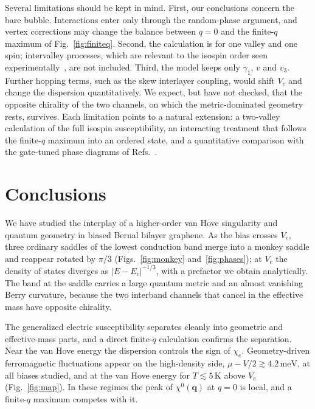 \documentclass[12pt,a4paper]{article}
\newcommand{\bq}{\mathbf{q}}
\newcommand{\chie}{\chi_{e}}
\newcommand{\meV}{\,\mathrm{meV}}
\begin{document}
Several limitations should be kept in mind. First, our conclusions concern the bare bubble. Interactions enter only through the random-phase argument, and vertex corrections may change the balance between $q=0$ and the finite-$q$ maximum of Fig.~\ref{fig:finiteq}. Second, the calculation is for one valley and one spin; intervalley processes, which are relevant to the isospin order seen experimentally~\citep{Zhou2022,Seiler2022,delaBarrera2022}, are not included. Third, the model keeps only $\gamma_1$, $v$ and $v_3$. Further hopping terms, such as the skew interlayer coupling, would shift $V_c$ and change the dispersion quantitatively. We expect, but have not checked, that the opposite chirality of the two channels, on which the metric-dominated geometry rests, survives. Each limitation points to a natural extension: a two-valley calculation of the full isospin susceptibility, an interacting treatment that follows the finite-$q$ maximum into an ordered state, and a quantitative comparison with the gate-tuned phase diagrams of Refs.~\citep{Zhou2022,Seiler2022,delaBarrera2022}.

\section{Conclusions}\label{sec:conclusions}

We have studied the interplay of a higher-order van Hove singularity and quantum geometry in biased Bernal bilayer graphene. As the bias crosses $V_c$, three ordinary saddles of the lowest conduction band merge into a monkey saddle and reappear rotated by $\pi/3$ (Figs.~\ref{fig:monkey} and~\ref{fig:phases}); at $V_c$ the density of states diverges as $|E-E_c|^{-1/3}$, with a prefactor we obtain analytically. The band at the saddle carries a large quantum metric and an almost vanishing Berry curvature, because the two interband channels that cancel in the effective mass have opposite chirality.

The generalized electric susceptibility separates cleanly into geometric and effective-mass parts, and a direct finite-$q$ calculation confirms the separation. Near the van Hove energy the dispersion controls the sign of $\chie$. Geometry-driven ferromagnetic fluctuations appear on the high-density side, $\mu-V/2\gtrsim4.2\meV$, at all biases studied, and at the van Hove energy for $T\lesssim5\,$K above $V_c$ (Fig.~\ref{fig:map}). In these regimes the peak of $\chi^0(\bq)$ at $q=0$ is local, and a finite-$q$ maximum competes with it.
\end{document}

